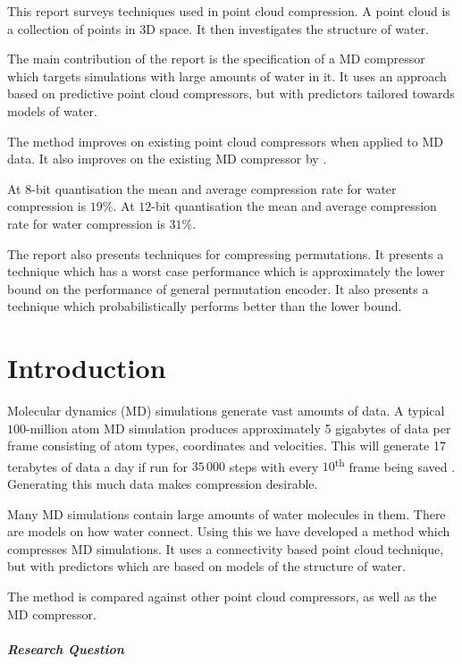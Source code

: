 \documentclass[a4paper]{report}
\begin{document}
This report surveys techniques used in point cloud compression. A point cloud
is a collection of points in 3D space. It then investigates the structure of
water. 

The main contribution of the report is the specification of a MD compressor
which targets simulations with large amounts of water in it. It uses an
approach based on predictive point cloud compressors, but with predictors
tailored towards models of water.

The method improves on existing point cloud compressors when applied to MD
data. It also improves on the existing MD compressor by
\citeauthor{omeltchenko2000sls}.

At $8$-bit quantisation the mean and average compression rate for water
compression is $19\%$. At $12$-bit quantisation the mean and average
compression rate for water compression is $31\%$.

The report also presents techniques for compressing permutations. It presents
a technique which has a worst case performance which is approximately the
lower bound on the performance of general permutation encoder. It also
presents a technique which probabilistically performs better than the lower
bound.

\tableofcontents

\chapter{Introduction}

Molecular dynamics (MD) simulations generate vast amounts of data. A typical
$100$-million atom MD simulation produces approximately 5 gigabytes of data
per frame consisting of atom types, coordinates and velocities. This will
generate 17 terabytes of data a day if run for $35\,000$ steps with every
$10$\textsuperscript{th} frame being saved
\citep{omeltchenko2000sls}. Generating this much data makes compression
desirable.

Many MD simulations contain large amounts of water molecules in them. There
are models on how water connect. Using this we have developed a method which
compresses MD simulations. It uses a connectivity based point cloud technique,
but with predictors which are based on models of the structure of water.

The method is compared against other point cloud compressors, as well as the
\citep{omeltchenko2000sls} MD compressor.


\paragraph{Research Question}
\end{document}

